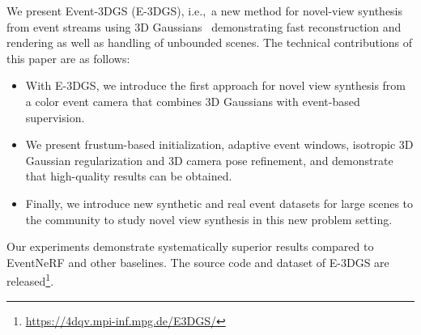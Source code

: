 We present Event-3DGS (E-3DGS), i.e.,~a new method for novel-view synthesis from event streams using 3D Gaussians~\cite{3dgs} 
demonstrating fast reconstruction and rendering as well as handling of unbounded scenes. 
The technical contributions of this paper are as follows: 
\begin{itemize}
\item With E-3DGS, we introduce the first approach for novel view synthesis from a color event camera that combines 3D Gaussians with event-based supervision. 
\item We present frustum-based initialization, adaptive event windows, isotropic 3D Gaussian regularization and 3D camera pose refinement, and demonstrate that high-quality results can be obtained. %

\item Finally, we introduce new synthetic and real event datasets for large scenes to the community to study novel view synthesis in this new problem setting. 
\end{itemize}
Our experiments demonstrate systematically superior results compared to EventNeRF \cite{eventnerf} and other baselines. 
The source code and dataset of E-3DGS are released\footnote{\url{https://4dqv.mpi-inf.mpg.de/E3DGS/}}. 




